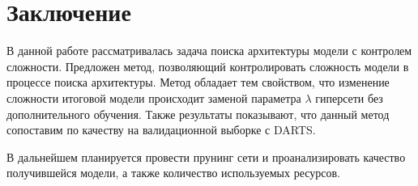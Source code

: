 \documentclass[12pt, twoside]{article}
\begin{document}
\section{Заключение}

В данной работе рассматривалась задача поиска архитектуры модели с контролем сложности. Предложен метод, позволяющий контролировать сложность модели в процессе поиска архитектуры. Метод обладает тем свойством, что изменение сложности итоговой модели происходит заменой параметра $\lambda$ гиперсети без дополнительного обучения. Также результаты показывают, что данный метод сопоставим по качеству на валидационной выборке с DARTS.

В дальнейшем планируется провести прунинг сети и проанализировать качество получившейся модели, а также количество используемых ресурсов.



\newpage

 \nocite{*}
\end{document}
